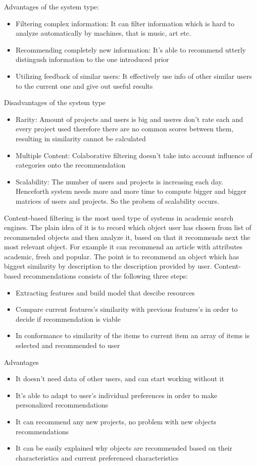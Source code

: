 \documentclass[10pt,twoside,english,a4paper]{article}
\begin{document}
Advantages of the system type:
\begin{itemize}
\item Filtering complex information:
It can filter information which is hard to analyze automatically by machines, that is music, art etc. 
\item Recommending completely new information:
It's able to recommend utterly distingush information to the one introduced prior
\item Utilizing feedback of similar users:
It effectively use info of other similar users to the current one and give out useful results
\end{itemize}

Disadvantages of the system type
\begin{itemize}
\item Rarity:
Amount of projects and users is big and useres don't rate each and every project used therefore there are no common scores between them, resulting in similarity cannot be calculated
\item Multiple Content:
Colaborative filtering doesn't take into account influence of categories onto the recommendation
\item Scalability:
The number of users and projects is increasing each day. Henceforth system needs more and more time to compute bigger and bigger matrices of users and projects. So the probem of scalability occurs.
\end{itemize}

\par Content-based filtering is the most used type of systems in academic search engines. The plain idea of it is to record which object user has chosen from list of recommended objects and then analyze it, based on that it recommends next the most relevant object. For example it can recommend an article with attributes academic, fresh and popular. The point is to recommend an object which has biggest similarity by description to the description provided by user.
Content-based recommendations consists of the following three steps:
\begin{itemize}
\item Extracting features and build model that descibe resources
\item Compare current features's similarity with previous features's in order to decide if recommendation is viable
\item In conformance to similarity of the items to current item an array of items is selected and recommended to user
\end{itemize}
Advantages
\begin{itemize}
\item It doesn't need data of other users, and can start working without it
\item It's able to adapt to user's individual preferences in order to make personalized recommendations
\item It can recommend any new projects, no problem with new objects recommendations
\item It can be easily explained why objects are recommended based on their characteristics and current preferenced characteristics
\end{itemize}
\end{document}
